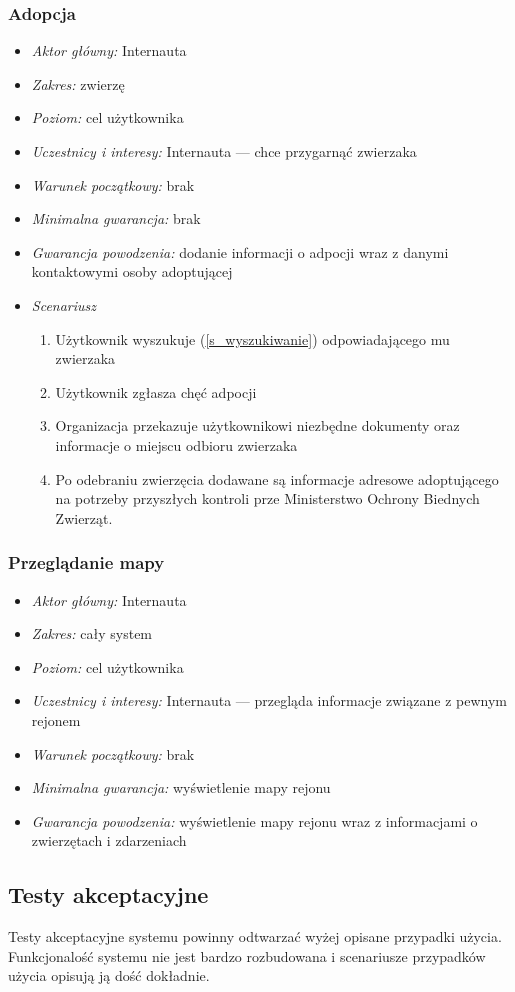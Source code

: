 \documentclass[10pt,a4paper]{article}
\begin{document}
\subsubsection{Adopcja}
\begin{itemize}
	\item \emph{Aktor główny:} Internauta
	\item \emph{Zakres:} zwierzę
	\item \emph{Poziom:} cel użytkownika
	\item \emph{Uczestnicy i interesy:} 
		Internauta --- chce przygarnąć zwierzaka
	\item \emph{Warunek początkowy:} brak
	\item \emph{Minimalna gwarancja:} brak
	\item \emph{Gwarancja powodzenia:} dodanie informacji o adpocji wraz z danymi kontaktowymi osoby adoptującej
	\item \emph{Scenariusz}
	\begin{enumerate}
		\item Użytkownik wyszukuje (\ref{s_wyszukiwanie}) odpowiadającego mu zwierzaka
		\item Użytkownik zgłasza chęć adpocji
		\item Organizacja przekazuje użytkownikowi niezbędne dokumenty oraz informacje o miejscu odbioru zwierzaka
		\item Po odebraniu zwierzęcia dodawane są informacje adresowe adoptującego na potrzeby przyszłych kontroli prze Ministerstwo Ochrony Biednych Zwierząt.
	\end{enumerate}
\end{itemize}

\subsubsection{Przeglądanie mapy}
\begin{itemize}
	\item \emph{Aktor główny:} Internauta
	\item \emph{Zakres:} cały system
	\item \emph{Poziom:} cel użytkownika
	\item \emph{Uczestnicy i interesy:} 
		Internauta --- przegląda informacje związane z pewnym rejonem
	\item \emph{Warunek początkowy:} brak
	\item \emph{Minimalna gwarancja:} wyświetlenie mapy rejonu
	\item \emph{Gwarancja powodzenia:} wyświetlenie mapy rejonu wraz z informacjami o zwierzętach i zdarzeniach
\end{itemize}

\subsection{Testy akceptacyjne}
Testy akceptacyjne systemu powinny odtwarzać wyżej opisane przypadki użycia. Funkcjonalość systemu nie jest bardzo rozbudowana i scenariusze przypadków użycia opisują ją dość dokładnie.
\end{document}
